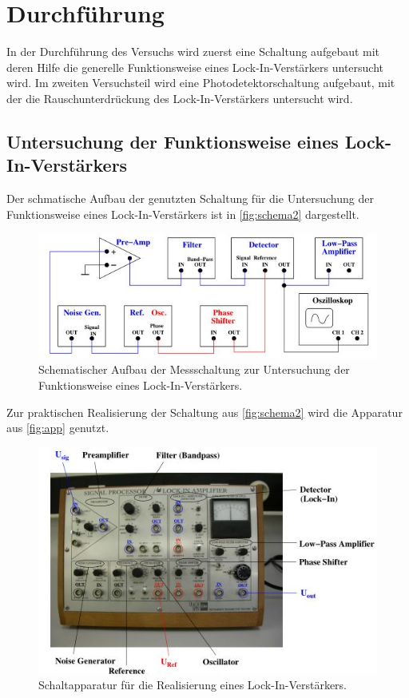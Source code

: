\section{Durchführung}
\label{sec:Durchführung}
In der Durchführung des Versuchs wird zuerst eine Schaltung aufgebaut mit deren Hilfe die generelle Funktionsweise eines Lock-In-Verstärkers untersucht wird. Im zweiten Versuchsteil wird eine Photodetektorschaltung aufgebaut, mit der die Rauschunterdrückung des Lock-In-Verstärkers untersucht wird.
\subsection{Untersuchung der Funktionsweise eines Lock-In-Verstärkers}
Der schmatische Aufbau der genutzten Schaltung für die Untersuchung der Funktionsweise eines Lock-In-Verstärkers ist in \autoref{fig:schema2} dargestellt.
\begin{figure}[H]
    \centering
    \includegraphics{images/schema2.JPG}
    \caption{Schematischer Aufbau der Messschaltung zur Untersuchung der Funktionsweise eines Lock-In-Verstärkers. \cite{sample}}
    \label{fig:schema2}
\end{figure}
\noindent
Zur praktischen Realisierung der Schaltung aus \autoref{fig:schema2} wird die Apparatur aus \autoref{fig:app} genutzt.
\begin{figure}[H]
    \centering
    \includegraphics{images/schaltung.JPG}
    \caption{Schaltapparatur für die Realisierung eines Lock-In-Verstärkers. \cite{sample}}
    \label{fig:app}
\end{figure}
\noindent
